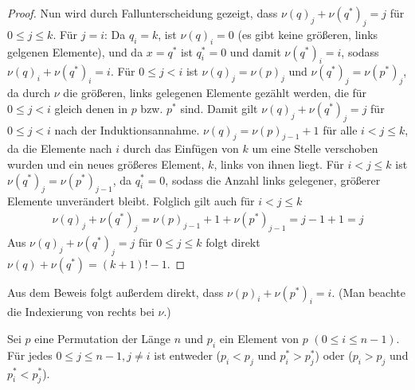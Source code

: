 \documentclass[a4paper, 10pt, ngerman]{article}
\begin{document}
\begin{proof}
    Nun wird durch Fallunterscheidung gezeigt, dass $\nu(q)_j + \nu(q^*)_j = j$ für $0 \le j \le k$. Für $j = i$: Da $q_i = k$, ist $\nu(q)_i = 0$ (es gibt keine größeren, links gelgenen Elemente), und da $x = q^*$ ist $q^*_i = 0$ und damit $\nu(q^*)_i = i$, sodass $\nu(q)_i + \nu(q^*)_i = i$. Für $0 \le j < i$ ist $\nu(q)_j = \nu(p)_j$ und $\nu(q^*)_j = \nu(p^*)_j$, da durch $\nu$ die größeren, links gelegenen Elemente gezählt werden, die für $0 \le j < i$ gleich denen in $p$ bzw. $p^*$ sind. Damit gilt $\nu(q)_j + \nu(q^*)_j = j$ für $0 \le j < i$ nach der Induktionsannahme. $\nu(q)_j = \nu(p)_{j - 1} + 1$ für alle $i < j \le k$, da die Elemente nach $i$ durch das Einfügen von $k$ um eine Stelle verschoben wurden und ein neues größeres Element, $k$, links von ihnen liegt. Für $i < j \le k$ ist $\nu(q^*)_j = \nu(p^*)_{j-1}$, da $q^*_i = 0$, sodass die Anzahl links gelegener, größerer Elemente unverändert bleibt. Folglich gilt auch für $i < j \le k$
    \begin{align*}
        \nu(q)_j + \nu(q^*)_j = \nu(p)_{j - 1} + 1 + \nu(p^*)_{j - 1} = j - 1 + 1 = j 
    \end{align*}
    Aus $\nu(q)_j + \nu(q^*)_j = j$ für $0 \le j \le k$ folgt direkt $\nu(q) + \nu(q^*) = (k + 1)! - 1$.
\end{proof}

Aus dem Beweis folgt außerdem direkt, dass $\nu(p)_i + \nu(p^*)_i = i$. (Man beachte die Indexierung von rechts bei $\nu$.)

\begin{lemma}
    Sei $p$ eine Permutation der Länge $n$ und $p_i$ ein Element von $p$ $(0 \le i \le n - 1)$. Für jedes $0 \le j \le n-1, j \ne i$ ist entweder ($p_i < p_j$ und $p^*_i > p^*_j$) oder ($p_i > p_j$ und $p^*_i < p^*_j$).
\end{lemma}
\end{document}
